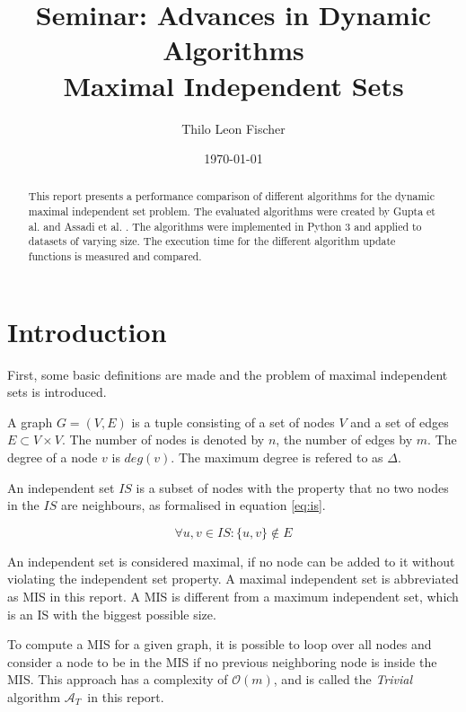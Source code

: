\documentclass[letterpaper,11pt]{article}
\newcommand{\trivial}{$\mathcal{A}_T$\ }
\begin{document}
\title{Seminar: Advances in Dynamic Algorithms \\ Maximal Independent Sets}
\author{Thilo Leon Fischer}
\date{\today}
\maketitle

\begin{abstract}
This report presents a performance comparison of different algorithms for
the dynamic maximal independent set problem. The evaluated algorithms
were created by Gupta et al. \cite{gupta2018simple} and Assadi et al.
\cite{assadi2019fully}. The algorithms were implemented in Python 3
and applied to datasets of varying size. The execution time for the
different algorithm update functions is measured and compared.

\end{abstract}


\section{Introduction}
\label{sec:intro}

First, some basic definitions are made and the problem of maximal independent sets
is introduced.

A graph $G = (V, E)$ is a tuple consisting of a set of nodes $V$ and a set of
edges $E \subset V \times V$. The number of nodes is denoted by $n$, the number
of edges by $m$. The degree of a node $v$ is $deg(v)$. The maximum degree is
refered to as $\Delta$.

An independent set $IS$ is a subset of nodes with the property that no two nodes
in the $IS$ are neighbours, as formalised in equation \ref{eq:is}.

\begin{equation}
	\label{eq:is}
\forall u, v \in IS: \{u, v\} \notin E
\end{equation}

An independent set is considered maximal, if no node can be added to it without
violating the independent set property. A maximal independent set is abbreviated
as MIS in this report. A MIS is different from a maximum independent set, which
is an IS with the biggest possible size.

To compute a MIS for a given graph, it is possible to loop over all nodes and
consider a node to be in the MIS if no previous neighboring node is inside the
MIS. This approach has a complexity of $\mathcal{O}(m)$, and is called the
\textit{Trivial} algorithm \trivial in this report.
\end{document}
